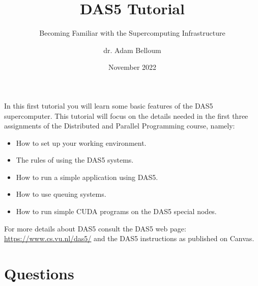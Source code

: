 \documentclass[parskip]{scrartcl}
\title{DAS5 Tutorial}
\subtitle{Becoming Familiar with the Supercomputing Infrastructure}
\author{dr. Adam Belloum}
\date{November 2022}
\begin{document}
\maketitle

In this first tutorial you will learn some basic features of the DAS5  supercomputer. This tutorial will focus on the details needed in the first three
assignments of the Distributed and Parallel Programming course, namely:

\begin{itemize}
\item How to set up your working environment.
\item The rules of using the DAS5 systems.
\item How to run a simple application using DAS5.
\item How to use queuing systems.
\item How to run simple CUDA programs on the DAS5 special nodes.
\end{itemize}

For more details about DAS5 consult the DAS5 web page: \url{https://www.cs.vu.nl/das5/} and the DAS5 instructions as published on Canvas.  

\section*{Questions}
\end{document}
